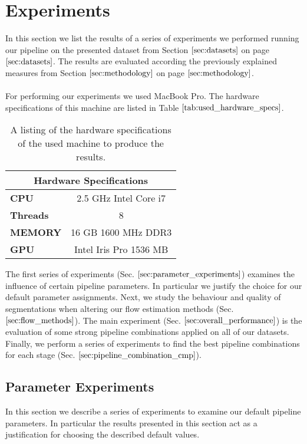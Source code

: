\section{Experiments}
\label{sec:experiments}
In this section we list the results of a series of experiments we performed running our pipeline on the presented dataset from Section $\ref{sec:datasets}$ on page $\pageref{sec:datasets}$. The results are evaluated according the previously explained measures from Section $\ref{sec:methodology}$ on page $\pageref{sec:methodology}$. \\ \\
For performing our experiments we used MacBook Pro. The hardware specifications of this machine are listed in Table $\ref{tab:used_hardware_specs}$. 
\begin{table}[H]
\centering
\begin{tabular}{|l|c|}
\hline
\multicolumn{2}{|c|}{\textbf{Hardware Specifications}} \\ \hline
\textbf{CPU} & 2.5 GHz Intel Core i7 \\ \hline
\textbf{Threads} & 8 \\ \hline
\textbf{MEMORY} & 16 GB 1600 MHz DDR3 \\ \hline
\textbf{GPU} & Intel Iris Pro 1536 MB \\ \hline
\end{tabular}
\caption[Hardware Specifications]{A listing of the hardware specifications of the used machine to produce the results.}
\label{tab:used_hardware_specs}
\end{table}
The first series of experiments (Sec. $\ref{sec:parameter_experiments}$) examines the influence of certain pipeline parameters. In particular we justify the choice for our default parameter assignments. Next, we study the behaviour and quality of segmentations when altering our flow estimation methods (Sec. $\ref{sec:flow_methods}$). The main experiment (Sec. $\ref{sec:overall_performance}$) is the evaluation of some strong pipeline combinations applied on all of our datasets. Finally, we perform a series of experiments to find the best pipeline combinations for each stage (Sec. $\ref{sec:pipeline_combination_cmp}$).

\subsection{Parameter Experiments}
\label{sec:parameter_experiments}
In this section we describe a series of experiments to examine our default pipeline parameters. In particular the results presented in this section act as a justification for choosing the described default values.

